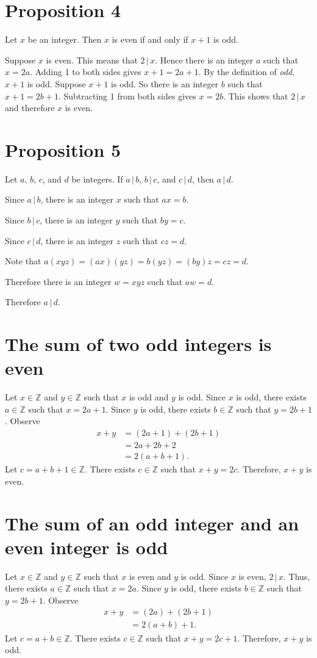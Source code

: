 \documentclass[12pt]{article}
\begin{document}
\section*{Proposition 4}
Let $x$ be an integer. Then $x$ is even if and only if $x+1$ is odd.

Suppose $x$ is even. This means that $2\,|\,x$. Hence there is an integer $a$ such that $x=2a$. Adding 1 to both sides gives $x+1=2a+1$. By the definition of \textit{odd}, $x+1$ is odd.
Suppose $x+1$ is odd. So there is an integer $b$ such that $x+1=2b+1$. Subtracting 1 from both sides gives $x=2b$. This shows that $2\,|\,x$ and therefore $x$ is even.
\section*{Proposition 5}
Let $a$, $b$, $c$, and $d$ be integers. If $a\,|\,b$, $b\,|\,c$, and $c\,|\,d$, then $a\,|\,d$.

Since $a\,|\,b$, there is an integer $x$ such that $ax=b$.

Since $b\,|\,c$, there is an integer $y$ such that $by=c$.

Since $c\,|\,d$, there is an integer $z$ such that $cz=d$.

Note that $a(xyz)=(ax)(yz)=b(yz)=(by)z=cz=d$.

Therefore there is an integer $w=xyz$ such that $aw=d$.

Therefore $a\,|\,d$.
\section{The sum of two odd integers is even}
Let $x\in\mathbb{Z}$ and $y\in\mathbb{Z}$ such that $x$ is odd and $y$ is odd. Since $x$ is odd, there exists $a\in\mathbb{Z}$ such that $x=2a+1$. Since $y$ is odd, there exists $b\in\mathbb{Z}$ such that $y=2b+1$. Observe
\begin{align*}
x+y
&=(2a+1)+(2b+1)\\
&=2a+2b+2\\
&=2(a+b+1).
\end{align*}
Let $c=a+b+1\in\mathbb{Z}$. There exists $c\in\mathbb{Z}$ such that $x+y=2c$. Therefore, $x+y$ is even.
\section{The sum of an odd integer and an even integer is odd}
Let $x\in\mathbb{Z}$ and $y\in\mathbb{Z}$ such that $x$ is even and $y$ is odd. Since $x$ is even, $2\,|\,x$. Thus, there exists $a\in\mathbb{Z}$ such that $x=2a$. Since $y$ is odd, there exists $b\in\mathbb{Z}$ such that $y=2b+1$. Observe
\begin{align*}
x+y
&=(2a)+(2b+1)\\
&=2(a+b)+1.
\end{align*}
Let $c=a+b\in\mathbb{Z}$. There exists $c\in\mathbb{Z}$ such that $x+y=2c+1$. Therefore, $x+y$ is odd.
\end{document}
